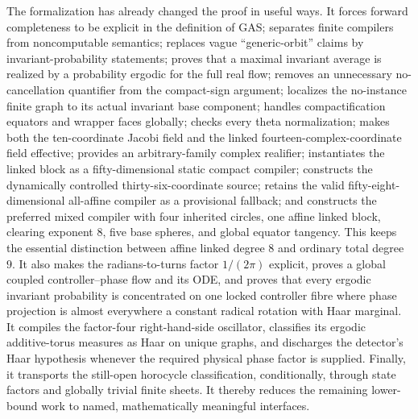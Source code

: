 \documentclass[11pt]{article}
\begin{document}
The formalization has already changed the proof in useful ways.  It forces
forward completeness to be explicit in the definition of GAS; separates
finite compilers from noncomputable semantics; replaces vague
``generic-orbit'' claims by invariant-probability statements; proves that a
maximal invariant average is realized by a probability ergodic for the full
real flow; removes an unnecessary no-cancellation quantifier from the
compact-sign argument; localizes the no-instance finite graph to its actual
invariant base component; handles compactification equators and wrapper
faces globally; checks every theta normalization; makes both the
ten-coordinate Jacobi field and the linked fourteen-complex-coordinate
field effective; provides an arbitrary-family complex realifier;
instantiates the linked block as a fifty-dimensional static compact
compiler; constructs the dynamically controlled thirty-six-coordinate
source; retains the valid fifty-eight-dimensional all-affine compiler as a
provisional fallback; and constructs the preferred mixed compiler with
four inherited circles, one affine linked block, clearing exponent \(8\),
five base spheres, and global equator tangency.  This keeps the essential
distinction between affine linked degree \(8\) and ordinary total degree
\(9\).  It also makes the radians-to-turns factor \(1/(2\pi)\) explicit,
proves a global coupled controller--phase flow and its ODE, and proves that
every ergodic invariant probability is concentrated on one locked
controller fibre where phase projection is almost everywhere a constant
radical rotation with Haar marginal.  It compiles the factor-four
right-hand-side oscillator, classifies its
ergodic additive-torus measures as Haar on unique graphs, and discharges
the detector's Haar hypothesis whenever the required physical phase factor
is supplied.  Finally, it transports the still-open horocycle
classification, conditionally, through state factors and globally trivial
finite sheets.  It thereby reduces the remaining lower-bound work to named,
mathematically meaningful interfaces.
\end{document}
